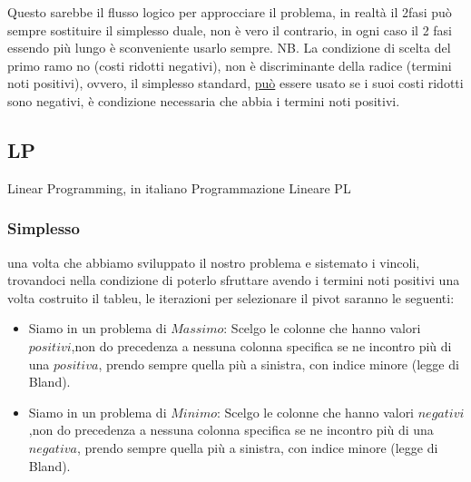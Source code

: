 \documentclass{article}
\begin{document}
\begin{center}
\end{center}

Questo sarebbe il flusso logico per approcciare il problema, in realtà il 2fasi può sempre sostituire il simplesso duale, non è vero il contrario, in ogni caso il 2 fasi essendo più lungo è sconveniente usarlo sempre.
NB. La condizione di scelta del primo ramo no (costi ridotti negativi), non è discriminante della radice (termini noti positivi), ovvero, il simplesso standard, \underline{può} essere usato se i suoi costi ridotti sono negativi, è condizione necessaria che abbia i termini noti positivi.
\subsection{LP}
Linear Programming, in italiano Programmazione Lineare PL
\subsubsection{Simplesso}
una volta che abbiamo sviluppato il nostro problema e sistemato i vincoli, trovandoci nella condizione di poterlo sfruttare avendo i termini noti positivi una volta costruito il tableu, le iterazioni per selezionare il pivot saranno le seguenti:\\
\begin{itemize}
\item Siamo in un problema di $Massimo$: Scelgo le colonne che hanno valori $positivi$,non do precedenza a nessuna colonna specifica se ne incontro più di una $positiva$, prendo sempre quella più a sinistra, con indice minore (legge di Bland).


\item Siamo in un problema di $Minimo$: Scelgo le colonne che hanno valori $negativi$,non do precedenza a nessuna colonna specifica se ne incontro più di una $negativa$, prendo sempre quella più a sinistra, con indice minore (legge di Bland).

\end{itemize}
\end{document}
